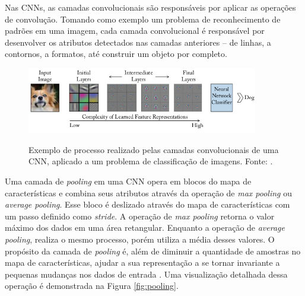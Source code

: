 Nas CNNs, as camadas convolucionais são responsáveis por aplicar as operações de convolução. Tomando como exemplo um problema de reconhecimento de padrões em uma imagem, cada camada convolucional é responsável por desenvolver os atributos detectados nas camadas anteriores -- de linhas, a contornos, a formatos, até construir um objeto por completo. 

\begin{figure}[h!]
\centering
\caption{Exemplo de processo realizado pelas camadas convolucionais de uma CNN, aplicado a um problema de classificação de imagens. Fonte: \cite{khan}.}
\includegraphics[width=0.9\textwidth]{imgs/camadas-convolucionais}
\label{fig:camadas-convolucionais}
\end{figure}


Uma camada de \emph{pooling} em uma CNN opera em blocos do mapa de características e combina seus atributos através da operação de \emph{max pooling} ou \emph{average pooling}. Esse bloco é deslizado através do mapa de características com um passo definido como \emph{stride}. A operação de \emph{max pooling} retorna o valor máximo dos dados em uma área retangular. Enquanto a operação de \emph{average pooling}, realiza o mesmo processo, porém utiliza a média desses valores. O propósito da camada de \emph{pooling} é, além de diminuir a quantidade de amostras no mapa de características, ajudar a sua representação a se tornar invariante a pequenas mudanças nos dados de entrada \cite{khan, goodfellow}. Uma visualização detalhada dessa operação é demonstrada na Figura \ref{fig:pooling}.

